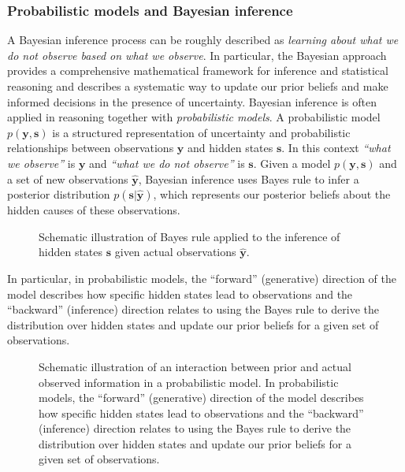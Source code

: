 \subsubsection{Probabilistic models and Bayesian inference}

A Bayesian inference process can be roughly described as \textit{learning about what we do not observe based on what we observe}.
In particular, the Bayesian approach provides a comprehensive mathematical framework for inference and statistical reasoning and describes a systematic way to update our prior beliefs and make informed decisions in the presence of uncertainty. 
Bayesian inference is often applied in reasoning together with \textit{probabilistic models}.
A probabilistic model $p(\bm{y}, \bm{s})$ is a structured representation of uncertainty and probabilistic relationships between observations $\bm{y}$ and hidden states $\bm{s}$. In this context \textit{``what we observe''} is $\bm{y}$ and \textit{``what we do not observe''} is $\bm{s}$.
Given a model $p(\bm{y}, \bm{s})$ and a set of new observations $\hat{\bm{y}}$, Bayesian inference uses Bayes rule to infer a posterior distribution $p(\bm{s}\vert\hat{\bm{y}})$, which represents our posterior beliefs about the hidden causes of these observations.
\begin{figure}
  \centering
  \resizebox{1.0\textwidth}{!}{}
  \caption{Schematic illustration of Bayes rule applied to the inference of hidden states $\bm{s}$ given actual observations $\hat{\bm{y}}$.}
  \label{fig:intro:bayesrule}
\end{figure}
In particular, in probabilistic models, the ``forward'' (generative) direction of the model describes how specific hidden states lead to observations and the ``backward'' (inference) direction relates to using the Bayes rule to derive the distribution over hidden states and update our prior beliefs for a given set of observations.
\begin{figure}
  \centering
  \resizebox{1.0\textwidth}{!}{}
  \caption{Schematic illustration of an interaction between prior and actual observed information in a probabilistic model.
    In probabilistic models, the ``forward'' (generative) direction of the model describes how specific hidden states lead to observations and the ``backward'' (inference) direction relates to using the Bayes rule to derive the distribution over hidden states and update our prior beliefs for a given set of observations.
  }
  \label{fig:intro:bayesflow}
\end{figure}
